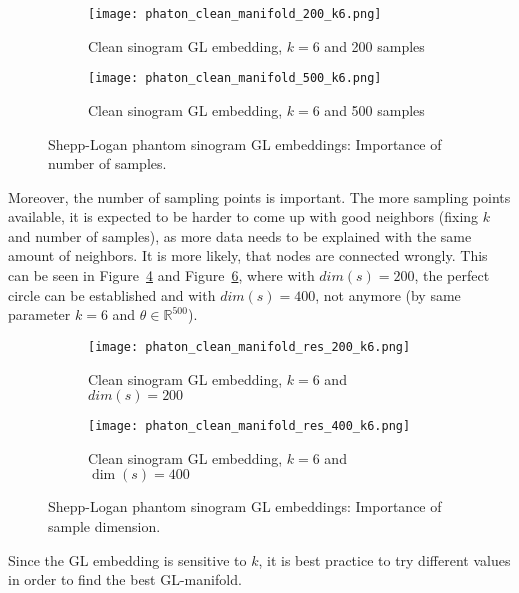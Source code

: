 \begin{figure}[H]
    \captionsetup[subfigure]{justification=centering}
    \centering
    \begin{subfigure}[t]{0.45\textwidth}
        \texttt{[image: phaton\_clean\_manifold\_200\_k6.png]}
        \caption{Clean sinogram GL embedding, $k = 6$ and 200 samples}
        \label{fig:clean_manifold_200}
    \end{subfigure}\hfill
    \begin{subfigure}[t]{0.45\textwidth}
      \texttt{[image: phaton\_clean\_manifold\_500\_k6.png]}
      \caption{Clean sinogram GL embedding, $k = 6$ and 500 samples}
      \label{fig:clean_manifold_500}
    \end{subfigure}\hfill
    \caption{Shepp-Logan phantom sinogram GL embeddings: Importance of number of samples.}
  \end{figure}


Moreover, the number of sampling points is important.
The more sampling points available, it is expected to be harder to come up with good neighbors (fixing $k$ and number of samples),
as more data needs to be explained with the same amount of neighbors. It is more likely, that nodes are connected wrongly.
This can be seen in Figure~\ref{fig:clean_manifold_res200} and Figure~\ref{fig:clean_manifold_res400}, where with $dim(s) = 200$,
the perfect circle can be established and with $dim(s) = 400$, not anymore (by same parameter $k = 6$ and $\theta \in \mathbb{R}^{500}$).

\begin{figure}[H]
    \captionsetup[subfigure]{justification=centering}
    \centering
    \begin{subfigure}[t]{0.4\textwidth}
        \texttt{[image: phaton\_clean\_manifold\_res\_200\_k6.png]}
        \caption{Clean sinogram GL embedding, $k = 6$ and $dim(s)=200$}
        \label{fig:clean_manifold_res200}
    \end{subfigure}\hfill
    \begin{subfigure}[t]{0.4\textwidth}
      \texttt{[image: phaton\_clean\_manifold\_res\_400\_k6.png]}
      \caption{Clean sinogram GL embedding, $k = 6$ and $\dim(s)=400$}
      \label{fig:clean_manifold_res400}
    \end{subfigure}\hfill
    \caption{Shepp-Logan phantom sinogram GL embeddings: Importance of sample dimension.}
  \end{figure}

\begin{tcolorbox}[colback=red!5!white,colframe=red!75!black]
    Since the GL embedding is sensitive to $k$, it is best practice to try different values in order to find the best GL-manifold.
\end{tcolorbox}





